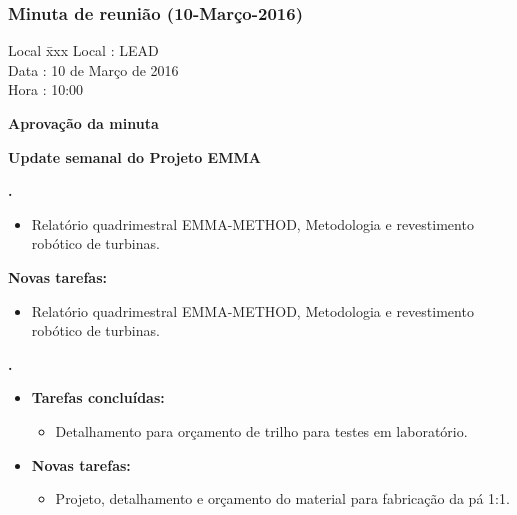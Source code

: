 \subsubsection{Minuta de reunião (10-Março-2016)}

\begin{tabbing}
  Local \= xxx \kill
  Local \> : LEAD \\
  Data  \> : 10 de Março de 2016 \\
  Hora  \> : 10:00
\end{tabbing} 


\textbf{Aprovação da minuta}

\textbf{Update semanal do Projeto EMMA}

						
\textbf{\gabriel.} 
	\begin{itemize}
			\item Relatório quadrimestral EMMA-METHOD, Metodologia e revestimento
			robótico de turbinas.
			\end{itemize}
		
		\item \textbf{Novas tarefas:}
			\begin{itemize} 
			\item Relatório quadrimestral EMMA-METHOD, Metodologia e revestimento
			robótico de turbinas.
			\end{itemize}

					
   \textbf{.} 
	\begin{itemize}
		\item \textbf{Tarefas concluídas:}
			\begin{itemize}    
			    \item Detalhamento para orçamento de trilho para testes em laboratório.
				
			\end{itemize}
		
		\item \textbf{Novas tarefas:}
			\begin{itemize} 
			    \item Projeto, detalhamento e orçamento do material para fabricação da pá
			    1:1.
			\end{itemize}
	\end{itemize}

